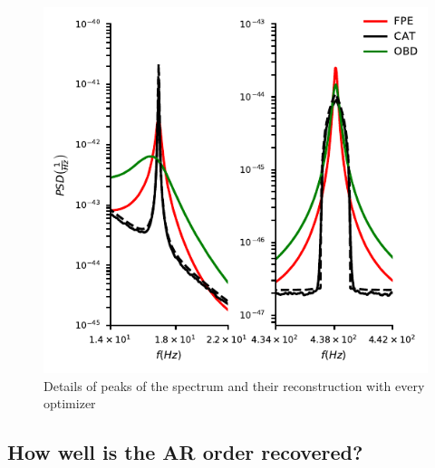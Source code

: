 \documentclass[twocolumn,showpacs,preprintnumbers,nofootinbib,prd,
superscriptaddress,10pt]{revtex4-1}
\begin{document}
\begin{figure}[t]
        \includegraphics[width = \linewidth]{Images/optimisers_comparison/ligo/compare_estimates_peaks.pdf}
        \caption{Details of peaks of the spectrum and their reconstruction with every optimizer}
        \label{fig:ligoPeaks}
\end{figure}

\subsection{How well is the AR order recovered?}
\end{document}
